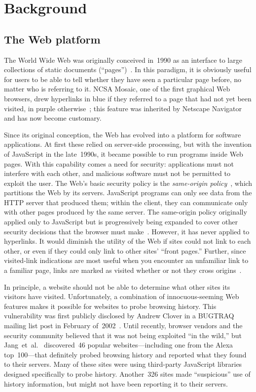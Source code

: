 \documentclass[conference]{IEEEtran}
\begin{document}
\section{Background}\label{sec:background}

\subsection{The Web platform}

The World Wide Web was originally conceived in~1990 as an interface to
large collections of static documents (“pages”)~\cite{wwwproposal}.
In this paradigm, it is obviously useful for users to be able to tell
whether they have seen a particular page before, no matter who is
referring to it.  NCSA Mosaic, one of the first graphical Web
browsers, drew hyperlinks in blue if they referred to a page that had
not yet been visited, in purple otherwise~\cite{niel95ht}; this
feature was inherited by Netscape Navigator and has now become
customary.

Since its original conception, the Web has evolved into a platform for
software applications.  At first these relied on server-side
processing, but with the invention of JavaScript in the late~1990s, it
became possible to run programs inside Web pages.  With this
capability comes a need for security: applications must not interfere
with each other, and malicious software must not be permitted to
exploit the user.  The Web's basic security policy is the
\emph{same-origin policy}~\cite{mozillasameorigin}, which partitions
the Web by its servers.  JavaScript programs can only see data from
the HTTP server that produced them; within the client, they can
communicate only with other pages produced by the same server.  The
same-origin policy originally applied only to JavaScript but is
progressively being expanded to cover other security decisions that
the browser must make~\cite{wang10incoherencies}.  However, it has
never applied to hyperlinks.  It would diminish the utility of the Web
if sites could not link to each other, or even if they could only link
to other sites' “front pages.”  Further, since visited-link
indications are most useful when you encounter an unfamiliar link to a
familiar page, links are marked as visited whether or not they cross
origins~\cite{jackson06thirdpartycookies}.

In principle, a website should not be able to determine what other
sites its visitors have visited.  Unfortunately, a combination of
innocuous-seeming Web features makes it possible for websites to probe
browsing history.  This vulnerability was first publicly disclosed by
Andrew Clover in a BUGTRAQ mailing list post in February
of~2002~\cite{bugtraq_visited}.  Until recently, browser vendors and
the security community believed that it was not being exploited “in
the wild,” but Jang~et~al.~\cite{jang10empirical} discovered~46
popular websites---including one from the Alexa top~100---that
definitely probed browsing history and reported what they found to
their servers.  Many of these sites were using third-party JavaScript
libraries designed specifically to probe history.  Another~326 sites
made “suspicious” use of history information, but might not have been
reporting it to their servers.
\end{document}
